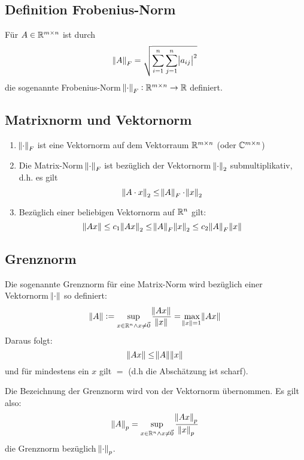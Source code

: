 \subsection{Definition Frobenius-Norm}
Für $A \in \mathbb{R}^{m \times n}$ ist durch
\begin{equation*}
	\norm{A}_F = \sqrt{\sum_{i=1}^n \sum_{j=1}^n \abs{a_{ij}}^2}
\end{equation*}
die sogenannte Frobenius-Norm $\norm{\cdot}_F: \mathbb{R}^{m \times n} \rightarrow \mathbb{R}$ definiert.

\subsection{Matrixnorm und Vektornorm}
\begin{enumerate}[label= (\alph*)]
	\item $\norm{\cdot}_F$ ist eine Vektornorm auf dem Vektorraum $\mathbb{R}^{m \times n}$ (oder $\mathbb{C}^{m \times n}$)
	\item Die Matrix-Norm $\norm{\cdot}_F$ ist bezüglich der Vektornorm $\norm{\cdot}_2$ submultiplikativ, d.h. es gilt
		\begin{equation*}
			\norm{A \cdot x}_2 \leq \norm{A}_F \cdot \norm{x}_2
		\end{equation*}
	\item Bezüglich einer beliebigen Vektornorm auf $\mathbb{R}^n$ gilt:
		\begin{equation*}
			\norm{A x} \leq c_1 \norm{A x}_2 \leq \norm{A}_F \norm{x}_2 \leq c_2 \norm{A}_F \norm{x}
		\end{equation*}
\end{enumerate}

\subsection{Grenznorm}
Die sogenannte Grenznorm für eine Matrix-Norm wird bezüglich einer Vektornorm $\norm{\cdot}$ so definiert:
\begin{equation*}
	\norm{A} := \sup_{x \in \mathbb{R}^n \land x\neq \vec{0}} \frac{\norm{A x}}{\norm{x}} = \max_{\norm{x}=1} \norm{A x}
\end{equation*}
Daraus folgt:
\begin{equation*}
	\norm{A x} \leq \norm{A} \norm{x}
\end{equation*}
und für mindestens ein $x$ gilt $=$ (d.h die Abschätzung ist scharf).

Die Bezeichnung der Grenznorm wird von der Vektornorm übernommen. Es gilt also:
\begin{equation*}
	\norm{A}_p = \sup_{x \in \mathbb{R}^n \land x \neq \vec{0}} \frac{\norm{A x}_p}{\norm{x}_p}
\end{equation*}
die Grenznorm bezüglich $\norm{\cdot}_p$.

